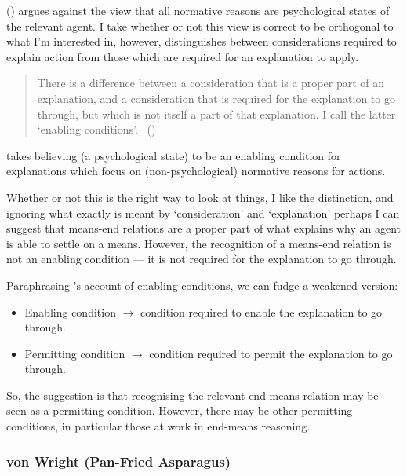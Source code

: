 \documentclass[10pt]{article}
\newcommand{\hozline}[0]{%
  \noindent\hdashrule[0.5ex][c]{\textwidth}{.1pt}{}
}
\begin{document}
\citeauthor{Dancy:2015aa} (\citeyear{Dancy:2000aa,Dancy:2015aa}) argues against the view that all normative reasons are psychological states of the relevant agent.
I take whether or not this view is correct to be orthogonal to what I'm interested in, however, \citeauthor{Dancy:2015aa} distinguishes between considerations required to explain action from those which are required for an explanation to apply.

\begin{quote}
  There is a difference between a consideration that is a proper part of an explanation, and a consideration that is required for the explanation to go through, but which is not itself a part of that explanation.
  I call the latter `enabling conditions'.\nolinebreak
  \mbox{ }\hfill\mbox{(\citeyear[200]{Dancy:2015aa})}
\end{quote}

\citeauthor{Dancy:2015aa} takes believing (a psychological state) to be an enabling condition for explanations which focus on (non-psychological) normative reasons for actions.

Whether or not this is the right way to look at things, I like the distinction, and ignoring what exactly is meant by `consideration' and `explanation' perhaps I can suggest that means-end relations are a proper part of what explains why an agent is able to settle on a means.
However, the recognition of a means-end relation is not an enabling condition --- it is not required for the explanation to go through.

Paraphrasing \citeauthor{Dancy:2015aa}'s account of enabling conditions, we can fudge a weakened version:

\begin{itemize}
\item Enabling condition \(\to\) condition required to enable the explanation to go through.
\item Permitting condition \(\to\) condition required to permit the explanation to go through.
\end{itemize}

So, the suggestion is that recognising the relevant end-means relation may be seen as a permitting condition.
However, there may be other permitting conditions, in particular those at work in end-means reasoning.

\hozline

\subsubsection*{von Wright \hfill (Pan-Fried Asparagus)}\mbox{ }
\end{document}
